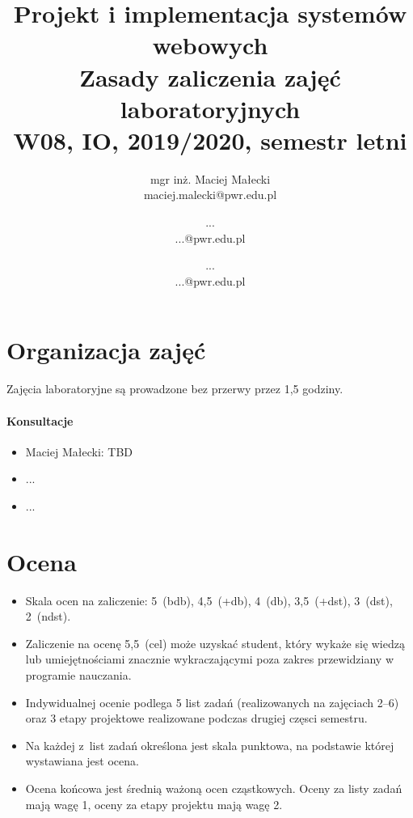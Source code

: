 \documentclass[12pt]{article}
\title{Projekt i implementacja systemów webowych\\
    \large Zasady zaliczenia zajęć laboratoryjnych\\
    \large W08, IO, 2019/2020, semestr letni}
\author{mgr inż. Maciej Małecki\\ \small maciej.malecki@pwr.edu.pl
    \and ...\\ \small ...@pwr.edu.pl
    \and ...\\ \small ...@pwr.edu.pl}
\begin{document}
    \maketitle

    \section*{Organizacja zajęć}
        Zajęcia laboratoryjne są prowadzone bez przerwy przez 1,5 godziny.
        \paragraph*{Konsultacje}
        \begin{itemize}
            \item Maciej Małecki: TBD
			\item ...
			\item ...
        \end{itemize}
    \section*{Ocena}
        \begin{itemize}
            \item Skala ocen na zaliczenie: 5~(bdb), 4,5~(+db), 4~(db), 3,5~(+dst), 3~(dst), 2~(ndst).
            \item Zaliczenie na ocenę 5,5~(cel) może uzyskać student, który wykaże się wiedzą lub umiejętnościami znacznie wykraczającymi poza zakres przewidziany w programie nauczania.
            \item Indywidualnej ocenie podlega 5 list zadań (realizowanych na zajęciach 2--6) oraz 3 etapy projektowe realizowane podczas drugiej częsci semestru.
            \item Na każdej z~list zadań określona jest skala punktowa, na podstawie której wystawiana jest ocena.
            \item Ocena końcowa jest średnią ważoną ocen cząstkowych. Oceny za listy zadań mają wagę 1, oceny za etapy projektu mają wagę 2.
        \end{itemize}
\end{document}
